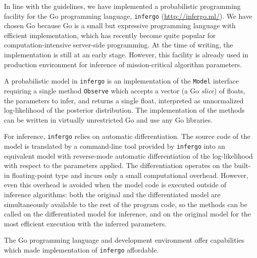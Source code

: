 \documentclass[sigplan,review]{acmart}\settopmatter{printfolios=true,printccs=false,printacmref=false}
\begin{document}
In line with the guidelines, we have implemented a probabilistic
programming facility for the Go programming language,
\texttt{infergo} (\url{http://infergo.ml/}). We have chosen Go
because Go is a small but expressive programming language with
efficient implementation, which has recently become quite
popular for computation-intensive server-side programming. At
the time of writing, the implementation is still at an early
stage. However, this facility is already used in production
environment for inference of mission-critical algorithm
parameters.  

A probabilistic model in \texttt{infergo} is an implementation
of the \texttt{Model} interface requiring a single method
\texttt{Observe} which accepts a vector (a Go \textit{slice}) of
floats, the parameters to infer, and returns a single float,
interpreted as unnormalized log-likelihood of the posterior
distribution. The implementation of the methods can be written
in virtually unrestricted Go and use any Go libraries.

For inference, \texttt{infergo} relies on automatic
differentiation. The source code of the model is
translated by a command-line tool provided by \texttt{infergo}
into an equivalent model with reverse-mode automatic
differentiation of the log-likelihood with respect 
to the parameters applied. The differentiation operates
on the built-in floating-point type and incurs only a small
computational overhead. However, even this overhead is avoided
when the model code is executed outside of inference algorithms:
both the original and the differentiated model are
simultaneously available to the rest of the program code, so
the methods can be called on the differentiated model for
inference, and on the original model for the most efficient
execution with the inferred parameters.

The Go programming language and development environment offer
capabilities which made implementation of \texttt{infergo}
affordable.
\end{document}

